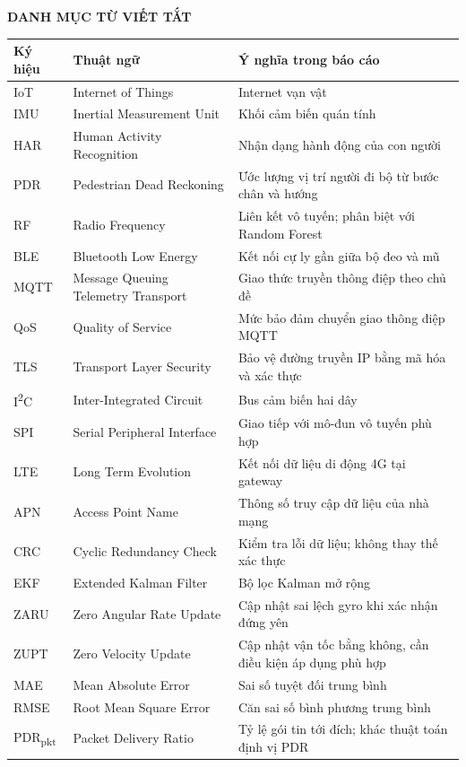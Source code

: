 \clearpage
\begin{center}\bfseries DANH MỤC TỪ VIẾT TẮT\end{center}
\begingroup\SmallTable
\begin{longtable}{|P{65bp}|P{148bp}|P{195bp}|}\hline
\textbf{Ký hiệu}&\textbf{Thuật ngữ}&\textbf{Ý nghĩa trong báo cáo}\\\hline\endhead
IoT&Internet of Things&Internet vạn vật\\\hline
IMU&Inertial Measurement Unit&Khối cảm biến quán tính\\\hline
HAR&Human Activity Recognition&Nhận dạng hành động của con người\\\hline
PDR&Pedestrian Dead Reckoning&Ước lượng vị trí người đi bộ từ bước chân và hướng\\\hline
RF&Radio Frequency&Liên kết vô tuyến; phân biệt với Random Forest\\\hline
BLE&Bluetooth Low Energy&Kết nối cự ly gần giữa bộ đeo và mũ\\\hline
MQTT&Message Queuing Telemetry Transport&Giao thức truyền thông điệp theo chủ đề\\\hline
QoS&Quality of Service&Mức bảo đảm chuyển giao thông điệp MQTT\\\hline
TLS&Transport Layer Security&Bảo vệ đường truyền IP bằng mã hóa và xác thực\\\hline
I\textsuperscript{2}C&Inter-Integrated Circuit&Bus cảm biến hai dây\\\hline
SPI&Serial Peripheral Interface&Giao tiếp với mô-đun vô tuyến phù hợp\\\hline
LTE&Long Term Evolution&Kết nối dữ liệu di động 4G tại gateway\\\hline
APN&Access Point Name&Thông số truy cập dữ liệu của nhà mạng\\\hline
CRC&Cyclic Redundancy Check&Kiểm tra lỗi dữ liệu; không thay thế xác thực\\\hline
EKF&Extended Kalman Filter&Bộ lọc Kalman mở rộng\\\hline
ZARU&Zero Angular Rate Update&Cập nhật sai lệch gyro khi xác nhận đứng yên\\\hline
ZUPT&Zero Velocity Update&Cập nhật vận tốc bằng không, cần điều kiện áp dụng phù hợp\\\hline
MAE&Mean Absolute Error&Sai số tuyệt đối trung bình\\\hline
RMSE&Root Mean Square Error&Căn sai số bình phương trung bình\\\hline
PDR\textsubscript{pkt}&Packet Delivery Ratio&Tỷ lệ gói tin tới đích; khác thuật toán định vị PDR\\\hline
\end{longtable}\endgroup
\clearpage
